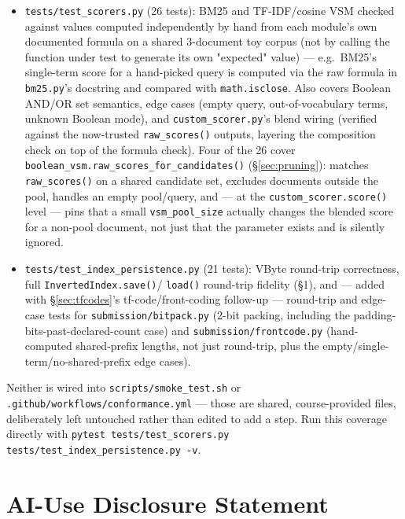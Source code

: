 \documentclass[11pt]{article}
\begin{document}
\begin{itemize}
\item \texttt{tests/test\_scorers.py} (26 tests): BM25 and TF-IDF/cosine
VSM checked against values computed independently by hand from each
module's own documented formula on a shared 3-document toy corpus (not
by calling the function under test to generate its own "expected"
value) --- e.g.\ BM25's single-term score for a hand-picked query is
computed via the raw formula in \texttt{bm25.py}'s docstring and
compared with \texttt{math.isclose}. Also covers Boolean AND/OR set
semantics, edge cases (empty query, out-of-vocabulary terms, unknown
Boolean mode), and \texttt{custom\_scorer.py}'s blend wiring (verified
against the now-trusted \texttt{raw\_scores()} outputs, layering the
composition check on top of the formula check). Four of the 26 cover
\texttt{boolean\_vsm.raw\_scores\_for\_candidates()}
(\S\ref{sec:pruning}): matches \texttt{raw\_scores()} on a shared
candidate set, excludes documents outside the pool, handles an empty
pool/query, and --- at the \texttt{custom\_scorer.score()} level --- pins
that a small \texttt{vsm\_pool\_size} actually changes the blended score
for a non-pool document, not just that the parameter exists and is
silently ignored.
\item \texttt{tests/test\_index\_persistence.py} (21 tests): VByte
round-trip correctness, full \texttt{InvertedIndex.save()}/
\texttt{load()} round-trip fidelity (\S 1), and --- added with
\S\ref{sec:tfcodes}'s tf-code/front-coding follow-up --- round-trip and
edge-case tests for \texttt{submission/bitpack.py} (2-bit packing,
including the padding-bits-past-declared-count case) and
\texttt{submission/frontcode.py} (hand-computed shared-prefix lengths,
not just round-trip, plus the empty/single-term/no-shared-prefix
edge cases).
\end{itemize}

\noindent Neither is wired into \texttt{scripts/smoke\_test.sh} or
\texttt{.github/workflows/conformance.yml} --- those are shared,
course-provided files, deliberately left untouched rather than edited to
add a step. Run this coverage directly with
\texttt{pytest tests/test\_scorers.py tests/test\_index\_persistence.py -v}.

\section{AI-Use Disclosure Statement}
\end{document}

